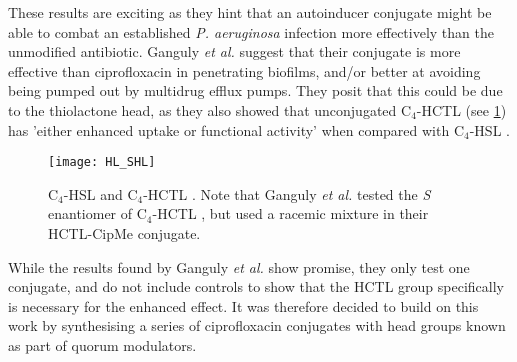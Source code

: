 These results are exciting as they hint that an autoinducer conjugate might be able to combat an established \textit{P. aeruginosa} infection more effectively than the unmodified antibiotic. 
Ganguly \textit{et al.} suggest that their conjugate is more effective than ciprofloxacin in penetrating biofilms, and/or better at avoiding being pumped out by multidrug efflux pumps. They posit that this could be due to the thiolactone head, as they also showed that unconjugated C$_4$-HCTL  (see \ref{fig:HL_SHL}) has 'either enhanced uptake or functional activity' when compared with C$_4$-HSL . 

\begin{figure}[H]
	\begin{center}
		\texttt{[image: HL\_SHL]}
		\caption{
		C$_4$-HSL  and C$_4$-HCTL . Note that Ganguly \textit{et al.} tested the \textit{S} enantiomer of C$_4$-HCTL , but used a racemic mixture in their HCTL-CipMe conjugate.
		\label{fig:HL_SHL}}
	\end{center}
\end{figure}

While the results found by Ganguly \textit{et al.} show promise, they only test one conjugate, and do not include controls to show that the HCTL group specifically is necessary for the enhanced effect.
It was therefore decided to build on this work by synthesising a series of ciprofloxacin conjugates with head groups known as part of quorum modulators\cite{Galloway2011,Hodgkinson2012a}.






